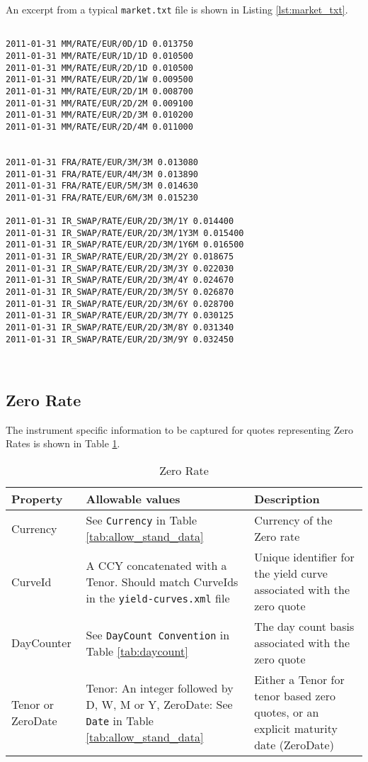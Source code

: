 An excerpt from a typical {\tt market.txt} file is shown in Listing \ref{lst:market_txt}.

\begin{lstlisting}[label=lst:market_txt,caption=Market File (market.txt)]

2011-01-31 MM/RATE/EUR/0D/1D 0.013750
2011-01-31 MM/RATE/EUR/1D/1D 0.010500
2011-01-31 MM/RATE/EUR/2D/1D 0.010500
2011-01-31 MM/RATE/EUR/2D/1W 0.009500
2011-01-31 MM/RATE/EUR/2D/1M 0.008700
2011-01-31 MM/RATE/EUR/2D/2M 0.009100
2011-01-31 MM/RATE/EUR/2D/3M 0.010200
2011-01-31 MM/RATE/EUR/2D/4M 0.011000


2011-01-31 FRA/RATE/EUR/3M/3M 0.013080
2011-01-31 FRA/RATE/EUR/4M/3M 0.013890
2011-01-31 FRA/RATE/EUR/5M/3M 0.014630
2011-01-31 FRA/RATE/EUR/6M/3M 0.015230

2011-01-31 IR_SWAP/RATE/EUR/2D/3M/1Y 0.014400
2011-01-31 IR_SWAP/RATE/EUR/2D/3M/1Y3M 0.015400
2011-01-31 IR_SWAP/RATE/EUR/2D/3M/1Y6M 0.016500
2011-01-31 IR_SWAP/RATE/EUR/2D/3M/2Y 0.018675
2011-01-31 IR_SWAP/RATE/EUR/2D/3M/3Y 0.022030
2011-01-31 IR_SWAP/RATE/EUR/2D/3M/4Y 0.024670
2011-01-31 IR_SWAP/RATE/EUR/2D/3M/5Y 0.026870
2011-01-31 IR_SWAP/RATE/EUR/2D/3M/6Y 0.028700
2011-01-31 IR_SWAP/RATE/EUR/2D/3M/7Y 0.030125
2011-01-31 IR_SWAP/RATE/EUR/2D/3M/8Y 0.031340
2011-01-31 IR_SWAP/RATE/EUR/2D/3M/9Y 0.032450

   
\end{lstlisting}


\subsection{Zero Rate}\label{ss:zero_rate}

The instrument specific information to be captured for quotes representing Zero Rates is shown in Table \ref{tab:zero_quote}.

\begin{table}[H]
\centering
\begin{tabular}{|p{3.3cm}|p{5cm}|p{7cm}|}
\hline
{\bf Property} & {\bf Allowable values} & {\bf Description} \\
\hline
Currency & See \lstinline!Currency! in Table \ref{tab:allow_stand_data} & Currency of the Zero rate\\ \hline
CurveId& A CCY concatenated with a Tenor. Should match CurveIds in the {\tt yield-curves.xml} file & Unique identifier for the yield curve associated with the zero quote\\ \hline
DayCounter & See \lstinline!DayCount Convention! in Table \ref{tab:daycount} & The day count basis associated with the zero quote \\ \hline
Tenor or ZeroDate & Tenor: An integer followed by D, W, M or Y, ZeroDate: See \lstinline!Date! in Table \ref{tab:allow_stand_data} & Either a Tenor for tenor based zero quotes, or an explicit maturity date (ZeroDate)\\
\hline
\end{tabular}
  \caption{Zero Rate}
  \label{tab:zero_quote}
\end{table}



